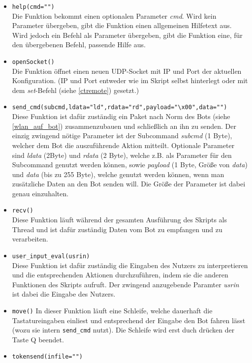 \begin{itemize}
    \item \verb+help(cmd="")+\\
    Die Funktion bekommt einen optionalen Parameter \textit{cmd}. Wird kein Parameter übergeben, gibt die Funktion einen allgemeinen Hilfetext aus. Wird jedoch ein Befehl als Parameter übergeben, gibt die Funktion eine, für den übergebenen Befehl, passende Hilfe aus.
    \item \verb+openSocket()+\\
    Die Funktion öffnet einen neuen UDP-Socket mit IP und Port der aktuellen Konfiguration. (IP und Port entweder wie im Skript selbst hinterlegt oder mit dem \textit{set}-Befehl (siehe \ref{ctremote}) gesetzt.)
    \item \verb+send_cmd(subcmd,ldata="ld",rdata="rd",payload="\x00",data="")+\\
    Diese Funktion ist dafür zuständig ein Paket nach Norm des Bots (siehe \ref{wlan_auf_bot}) zusammenzubauen und schließlich an ihn zu senden.
    Der einzig zwingend nötige Parameter ist der Subcommand \textit{subcmd} (1 Byte), welcher dem Bot die auszuführende Aktion mitteilt.
    Optionale Parameter sind \textit{ldata} (2Byte) und \textit{rdata} (2 Byte), welche z.B. als Parameter für den Subcommand genutzt werden können, sowie \textit{payload} (1 Byte, Größe von \textit{data}) und \textit{data} (bis zu 255 Byte), welche genutzt werden können, wenn man zusätzliche Daten an den Bot senden will.
    Die Größe der Parameter ist dabei genau einzuhalten.
    \item \verb+recv()+\\
    Diese Funktion läuft während der gesamten Ausführung des Skripts als Thread und ist dafür zuständig Daten vom Bot zu empfangen und zu verarbeiten.
    \item \verb+user_input_eval(usrin)+\\
    Diese Funktion ist dafür zuständig die Eingaben des Nutzers zu interpretieren und die entsprechenden Aktionen durchzuführen, indem sie die anderen Funktionen des Skripts aufruft.
    Der zwingend anzugebende Paramter \textit{usrin} ist dabei die Eingabe des Nutzers.
    \item \verb+move()+
    In dieser Funktion läuft eine Schleife, welche dauerhaft die Tastatureingaben einliest und entsprechend der Eingabe den Bot fahren lässt (wozu sie intern \verb+send_cmd+ nutzt). Die Schleife wird erst duch drücken der Taste Q beendet.
    \item \verb+tokensend(infile="")+\\

\end{itemize}
